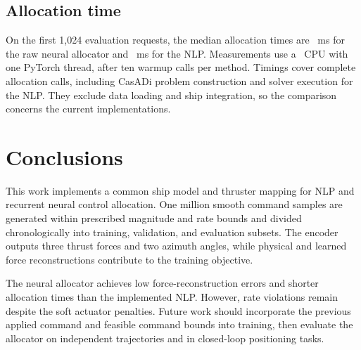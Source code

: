 \documentclass[conference]{IEEEtran}
\begin{document}
\subsection{Allocation time}
On the first 1,024 evaluation requests, the median allocation times are
\NNMedian~ms for the raw neural allocator and \NLPMedian~ms for the NLP.
Measurements use a \CPUModel\ CPU with one PyTorch thread, after ten
warmup calls per method. Timings cover complete allocation calls, including
CasADi problem construction and solver execution for the NLP. They exclude
data loading and ship integration, so the comparison concerns the current
implementations.

\balance
\section{Conclusions}
This work implements a common ship model and thruster mapping for NLP and
recurrent neural control allocation. One million smooth command samples
are generated within prescribed magnitude and rate bounds and divided
chronologically into training, validation, and evaluation subsets. The
encoder outputs three thrust forces and two azimuth angles, while physical
and learned force reconstructions contribute to the training objective.

The neural allocator achieves low force-reconstruction errors and shorter
allocation times than the implemented NLP. However, rate violations remain
despite the soft actuator penalties. Future work should incorporate the
previous applied command and feasible command bounds into training, then
evaluate the allocator on independent trajectories and in closed-loop
positioning tasks.



\end{document}
